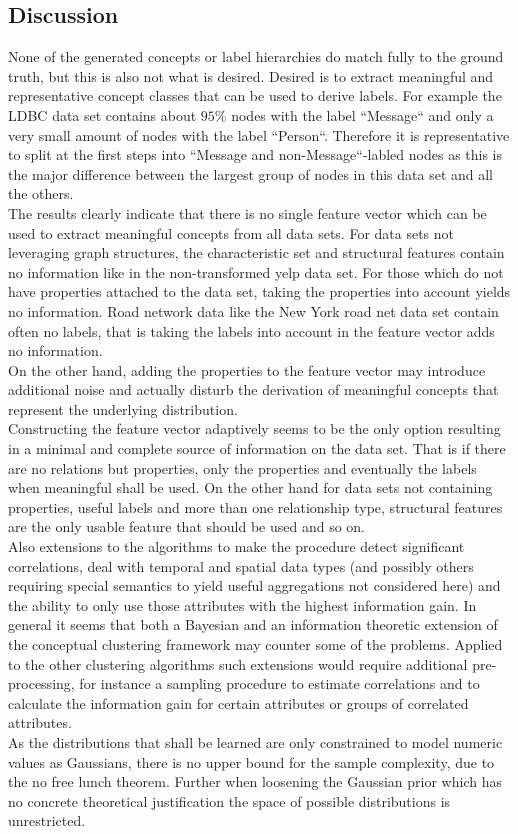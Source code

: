 \subsection{Discussion}\label{\positionnumber}
 None of the generated concepts or label hierarchies do match fully to the ground truth, but this is also not what is desired. Desired is to extract meaningful and representative concept classes that can be used to derive labels. For example the LDBC data set contains about $95\%$ nodes with the label ``Message`` and only a very small amount of nodes with the label ``Person``. Therefore it is representative to split at the first steps into ``Message and non-Message``-labled nodes as this is the major difference between the largest group of nodes in this data set and all the others. \\
 The results clearly indicate that there is no single feature vector which can be used to extract meaningful concepts from all data sets. For data sets not leveraging graph structures, the characteristic set and structural features contain no information like in the non-transformed yelp data set. For those which do not have properties attached to the data set, taking the properties into account yields no information. Road network data like the New York road net data set contain often no labels, that is taking the labels into account in the feature vector adds no information. \\
 On the other hand, adding the properties to the feature vector may introduce additional noise and actually disturb the derivation of meaningful concepts that represent the underlying distribution. \\
 Constructing the feature vector adaptively seems to be the only option resulting in a minimal and complete source of information on the data set. That is if there are no relations but properties, only the properties and eventually the labels when meaningful shall be used. On the other hand for data sets not containing properties, useful labels and more than one relationship type, structural features are the only usable feature that should be used and so on. \\
 Also extensions to the algorithms to make the procedure detect significant correlations, deal with temporal and spatial data types (and possibly others requiring special semantics to yield useful aggregations not considered here) and the ability to only use those attributes with the highest information gain. In general it seems that both a Bayesian and an information theoretic extension of the conceptual clustering framework may counter some of the problems. Applied to the other clustering algorithms such extensions would require additional pre-processing, for instance a sampling procedure to estimate correlations and to calculate the information gain for certain attributes or groups of correlated attributes. \\
 As the distributions that shall be learned are only constrained to model numeric values as Gaussians, there is no upper bound for the sample complexity, due to the no free lunch theorem. Further when loosening the Gaussian prior which has no concrete theoretical justification the space of possible distributions is unrestricted. 
